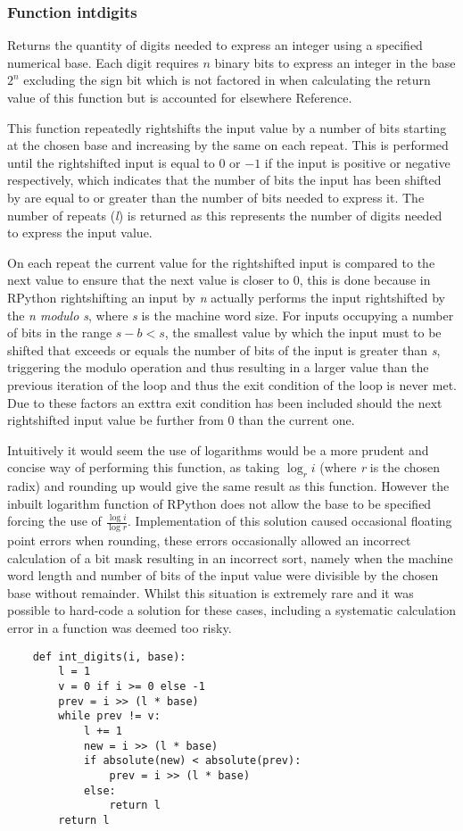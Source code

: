 \documentclass[12pt]{article}
\begin{document}
\subsubsection{Function int\textunderscore digits}
\label{ssec:intdigits}
Returns the quantity of digits needed to express an integer using a specified numerical base. Each digit requires $n$ binary bits to express an integer in the base $2^n$ excluding the sign bit which is not factored in when calculating the return value of this function but is accounted for elsewhere {\color{red} Reference}.
\par
This function repeatedly rightshifts the input value by a number of bits starting at the chosen base and increasing by the same on each repeat. This is performed until the rightshifted input is equal to $0$ or $-1$ if the input is positive or negative respectively, which indicates that the number of bits the input has been shifted by are equal to or greater than the number of bits needed to express it. The number of repeats (\textit{l}) is returned as this represents the number of digits needed to express the input value.
\par
On each repeat the current value for the rightshifted input is compared to the next value to ensure that the next value is closer to $0$, this is done because in RPython rightshifting an input by \textit{n} actually performs the input rightshifted by the \textit{n modulo s}, where \textit{s} is the machine word size. For inputs occupying a number of bits in the range $s-b < s$, the smallest value by which the input must to be shifted that exceeds or equals the number of bits of the input is greater than \textit{s}, triggering the modulo operation and thus resulting in a larger value than the previous iteration of the loop and thus the exit condition of the loop is never met. Due to these factors an exttra exit condition has been included should the next rightshifted input value be further from 0 than the current one.
\par
Intuitively it would seem the use of logarithms would be a more prudent and concise way of performing this function, as taking $\log _{r} i$ (where \textit{r} is the chosen radix) and rounding up would give the same result as this function. However the inbuilt logarithm function of RPython does not allow the base to be specified forcing the use of $\frac{\log i}{\log r}$. Implementation of this solution caused occasional floating point errors when rounding, these errors occasionally allowed an incorrect calculation of a bit mask resulting in an incorrect sort, namely when the machine word length and number of bits of the input value were divisible by the chosen base without remainder. Whilst this situation is extremely rare and it was possible to hard-code a solution for these cases, including a systematic calculation error in a function was deemed too risky.
\begin{lstlisting}
	def int_digits(i, base):
		l = 1
		v = 0 if i >= 0 else -1
		prev = i >> (l * base)
		while prev != v:
			l += 1
			new = i >> (l * base)
			if absolute(new) < absolute(prev):
				prev = i >> (l * base)
			else:
				return l
		return l
\end{lstlisting}
\pagebreak
\end{document}
